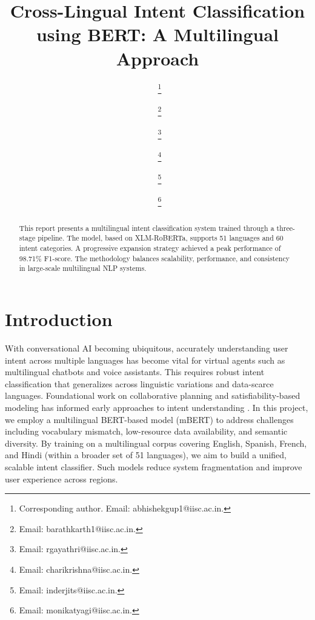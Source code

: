 \documentclass{ecai}
\begin{document}

\begin{frontmatter}


\title{Cross-Lingual Intent Classification using BERT: A Multilingual Approach}

\author[A]{~\thanks{Corresponding author. Email: abhishekgup1@iisc.ac.in.}}
\author[A]{~\snm{}\thanks{Email: barathkarth1@iisc.ac.in.}}
\author[A]{~\thanks{Email: rgayathri@iisc.ac.in.}}
\author[A]{~\thanks{Email: charikrishna@iisc.ac.in.}}
\author[A]{~\thanks{Email: inderjits@iisc.ac.in.}}
\author[A]{~\thanks{Email: monikatyagi@iisc.ac.in.}}

\address[A]{Indian Institute of Science, Bengaluru}

\begin{abstract}
This report presents a multilingual intent classification system trained through a three-stage pipeline. The model, based on XLM-RoBERTa, supports 51 languages and 60 intent categories. A progressive expansion strategy achieved a peak performance of 98.71\% F1-score. The methodology balances scalability, performance, and consistency in large-scale multilingual NLP systems.
\end{abstract}

\end{frontmatter}


\section{Introduction}
With conversational AI becoming ubiquitous, accurately understanding user intent across multiple languages has become vital for virtual agents such as multilingual chatbots and voice assistants. This requires robust intent classification that generalizes across linguistic variations and data-scarce languages. Foundational work on collaborative planning and satisfiability-based modeling has informed early approaches to intent understanding \cite{grosz1996collaborative,kautz1992planning}. In this project, we employ a multilingual BERT-based model (mBERT) to address challenges including vocabulary mismatch, low-resource data availability, and semantic diversity. By training on a multilingual corpus covering English, Spanish, French, and Hindi (within a broader set of 51 languages), we aim to build a unified, scalable intent classifier. Such models reduce system fragmentation and improve user experience across regions.
\end{document}
